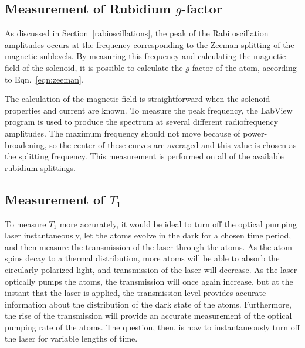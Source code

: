 \subsection{Measurement of Rubidium $g$-factor}

As discussed in Section~\ref{rabioscillations}, the peak of the Rabi oscillation amplitudes occurs at the frequency corresponding to the Zeeman splitting of the magnetic sublevels. By measuring this frequency and calculating the magnetic field of the solenoid, it is possible to calculate the $g$-factor of the atom, according to Eqn.~\ref{eqn:zeeman}.

The calculation of the magnetic field is straightforward when the solenoid properties and current are known. To measure the peak frequency, the LabView program is used to produce the spectrum at several different radiofrequency amplitudes. The maximum frequency should not move because of power-broadening, so the center of these curves are averaged and this value is chosen as the splitting frequency. This measurement is performed on all of the available rubidium splittings.

\subsection{Measurement of $T_{1}$}\label{measurementoft1}

To measure $T_{1}$ more accurately, it would be ideal to turn off the optical pumping laser instantaneously, let the atoms evolve in the dark for a chosen time period, and then measure the transmission of the laser through the atoms. \cite{franzen} As the atom spins decay to a thermal distribution, more atoms will be able to absorb the circularly polarized light, and transmission of the laser will decrease. As the laser optically pumps the atoms, the transmission will once again increase, but at the instant that the laser is applied, the transmission level provides accurate information about the distribution of the dark state of the atoms. Furthermore, the rise of the transmission will provide an accurate measurement of the optical pumping rate of the atoms. The question, then, is how to instantaneously turn off the laser for variable lengths of time.


